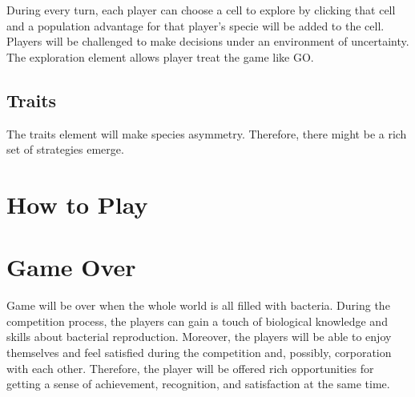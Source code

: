 \documentclass[12pt,a4paper,twoside]{scrartcl}
\begin{document}
During every turn, each player can choose a cell to explore by clicking that cell and a population advantage for that player's specie will be added to the cell. Players will be challenged to make decisions under an environment of uncertainty. The exploration element allows player treat the game like GO.

\subsection{Traits}

The traits element will make species asymmetry. Therefore, there might be a rich set of strategies emerge.

\section{How to Play}

\section{Game Over}
Game will be over when the whole world is all filled with bacteria. During the competition process, the players can gain a touch of biological knowledge and skills about bacterial reproduction. Moreover, the players will be able to enjoy themselves and feel satisfied during the competition and, possibly, corporation with each other. Therefore, the player will be offered rich opportunities for getting a sense of achievement, recognition, and satisfaction at the same time.
\end{document}
